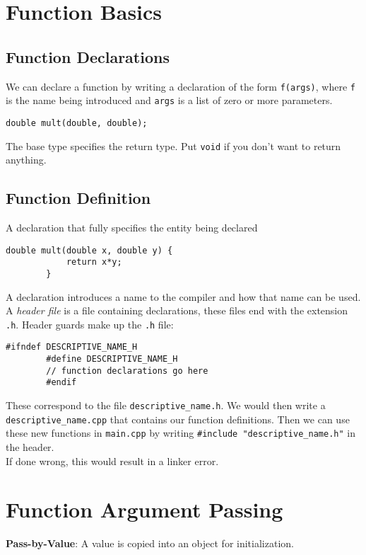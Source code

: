\documentclass{article}
\begin{document}
	\section{Function Basics}
	
	\subsection{Function Declarations}
	
	We can declare a function by writing a declaration of the form \verb|f(args)|, where \verb|f| is the name being introduced and \verb|args| is a list of zero or more parameters.
	\begin{lstlisting}[gobble=4]
		double mult(double, double);
	\end{lstlisting}
	The base type specifies the return type. Put \verb|void| if you don't want to return anything.
	
	\subsection{Function Definition}
	
	A declaration that fully specifies the entity being declared
	\begin{lstlisting}[gobble=4]
		double mult(double x, double y) {
		    return x*y;
		}
	\end{lstlisting}
	A declaration introduces a name to the compiler and how that name can be used. A \textit{header file} is a file containing declarations, these files end with the extension \verb|.h|. Header guards make up the \verb|.h| file:
	\begin{lstlisting}[gobble=4]
		#ifndef DESCRIPTIVE_NAME_H
		#define DESCRIPTIVE_NAME_H
		// function declarations go here
		#endif
	\end{lstlisting}
	These correspond to the file \verb|descriptive_name.h|. We would then write a \verb|descriptive_name.cpp| that contains our function definitions. Then we can use these new functions in \verb|main.cpp| by writing \verb|#include "descriptive_name.h"| in the header.\\
	
	If done wrong, this would result in a linker error.
	
	
	\section{Function Argument Passing}
	
	\textbf{Pass-by-Value}: A value is copied into an object for initialization.
	
\end{document}
